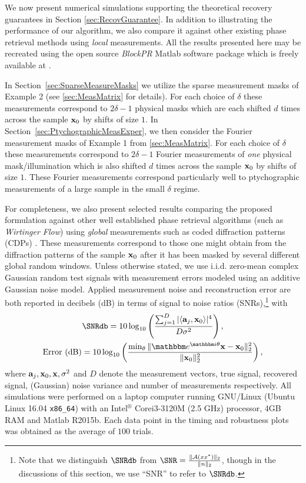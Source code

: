 We now present numerical simulations supporting the theoretical recovery guarantees in Section \ref{sec:RecovGuarantee}.  In addition to illustrating the performance of our algorithm, we also compare it against other existing phase retrieval methods using {\em local} measurements. All the results presented here may be recreated using the open source {\em BlockPR} Matlab software package which is freely available at \cite{bitbucket_BlockPR}.

In Section~\ref{sec:SparseMeasureMasks} we utilize the sparse measurement masks of Example 2 (see \cref{sec:MeasMatrix} for details). For each choice of $\delta$ these measurements correspond to $2\delta - 1$ physical masks which are each shifted $d$ times across the sample $\mathbf x_0$ by shifts of size $1$. In Section~\ref{sec:PtychographicMeasExper}, we then consider the Fourier measurement masks of Example 1 from \cref{sec:MeasMatrix}. For each choice of $\delta$ these measurements correspond to $2\delta - 1$ Fourier measurements of {\em one} physical mask/illumination which is also shifted $d$ times across the sample $\mathbf x_0$ by shifts of size $1$. These Fourier measurements correspond particularly well to ptychographic measurements of a large sample in the small $\delta$ regime.

For completeness, we also present selected results comparing the proposed formulation against other well established phase retrieval algorithms (such as {\em Wirtinger Flow}) using {\em global} measurements such as coded diffraction patterns (CDPs) \cite[\S 1.5]{Candes2014WF}.  These measurements correspond to those one might obtain from the diffraction patterns of the sample $\mathbf x_0$ after it has been masked by several different global random windows. Unless otherwise stated, we use i.i.d.  zero-mean complex Gaussian random test signals with measurement errors modeled using an additive Gaussian noise model. Applied measurement noise and reconstruction error are both reported in decibels (dB) in terms of signal to noise ratios (SNRs),\footnote{Note that we distinguish $\SNRdb$ from $\SNR = \frac{\norm{\Ac(x x^*)}_2}{\norm{n}_2}$, though in the discussions of this section, we use ``SNR'' to refer to $\SNRdb$.} with 
%
\begin{gather*}  \SNRdb = 10 \log_{10} \left( 
        \frac{\sum_{j=1}^D\vert \langle \a_j, \x_0 \rangle \vert ^4}
            {D\sigma^2} \right), \\
    \mbox{Error (dB)} = 10 \log_{10} \left( \frac{\min_\theta \|\ee^{\ii \theta} \x - 
	\x_0 \|_2^2}{\| \x_0 \|^2_2}\right),  \end{gather*}
%
where $\mathbf a_j, \mathbf x_0, \mathbf x, \sigma^2$ and $D$ denote the measurement vectors, true signal, recovered signal, (Gaussian) noise variance and number of measurements respectively.  All simulations were performed on a laptop computer running GNU/Linux (Ubuntu Linux 16.04 \verb|x86_64|) with an Intel$^\circledR$ Core\texttrademark i3-3120M (2.5 GHz) processor, 4GB RAM and Matlab R2015b. Each data point in the timing and robustness plots was obtained as the average of $100$ trials.

